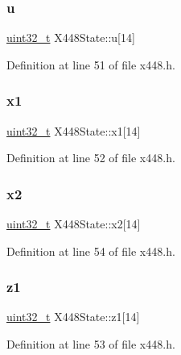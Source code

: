 \subsubsection{\texorpdfstring{u}{u}}
{\footnotesize\ttfamily \hyperlink{stdint_8h_a435d1572bf3f880d55459d9805097f62}{uint32\+\_\+t} X448\+State\+::u\mbox{[}14\mbox{]}}



Definition at line 51 of file x448.\+h.

\mbox{\label{structX448State_a97014ace9f623a1ca53a7997a9c3651d}} 
\subsubsection{\texorpdfstring{x1}{x1}}
{\footnotesize\ttfamily \hyperlink{stdint_8h_a435d1572bf3f880d55459d9805097f62}{uint32\+\_\+t} X448\+State\+::x1\mbox{[}14\mbox{]}}



Definition at line 52 of file x448.\+h.

\mbox{\label{structX448State_a5c14a6c35df396ac024a2a9a4071f884}} 
\subsubsection{\texorpdfstring{x2}{x2}}
{\footnotesize\ttfamily \hyperlink{stdint_8h_a435d1572bf3f880d55459d9805097f62}{uint32\+\_\+t} X448\+State\+::x2\mbox{[}14\mbox{]}}



Definition at line 54 of file x448.\+h.

\mbox{\label{structX448State_a8575219540e051b3de1cbf809e1e27ac}} 
\subsubsection{\texorpdfstring{z1}{z1}}
{\footnotesize\ttfamily \hyperlink{stdint_8h_a435d1572bf3f880d55459d9805097f62}{uint32\+\_\+t} X448\+State\+::z1\mbox{[}14\mbox{]}}



Definition at line 53 of file x448.\+h.

